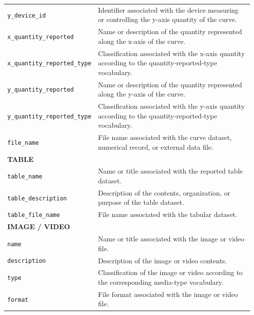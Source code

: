 \documentclass[11pt]{book}
\begin{document}
{\begin{longtable}{p{}p{}}
\texttt{y\_device\_id} &
Identifier associated with the device measuring or controlling the y-axis quantity of the curve. \\

\texttt{x\_quantity\_reported} &
Name or description of the quantity represented along the x-axis of the curve. \\

\texttt{x\_quantity\_reported\_type} &
Classification associated with the x-axis quantity according to the quantity-reported-type vocabulary. \\

\texttt{y\_quantity\_reported} &
Name or description of the quantity represented along the y-axis of the curve. \\

\texttt{y\_quantity\_reported\_type} &
Classification associated with the y-axis quantity according to the quantity-reported-type vocabulary. \\

\texttt{file\_name} &
File name associated with the curve dataset, numerical record, or external data file. \\

\hline
\multicolumn{2}{l}{\textbf{TABLE}}\\
\hline

\texttt{table\_name} &
Name or title associated with the reported table dataset. \\

\texttt{table\_description} &
Description of the contents, organization, or purpose of the table dataset. \\

\texttt{table\_file\_name} &
File name associated with the tabular dataset. \\

\hline
\multicolumn{2}{l}{\textbf{IMAGE / VIDEO}}\\
\hline

\texttt{name} &
Name or title associated with the image or video file. \\

\texttt{description} &
Description of the image or video contents. \\

\texttt{type} &
Classification of the image or video according to the corresponding media-type vocabulary. \\

\texttt{format} &
File format associated with the image or video file. \\


\end{longtable}}
\end{document}
